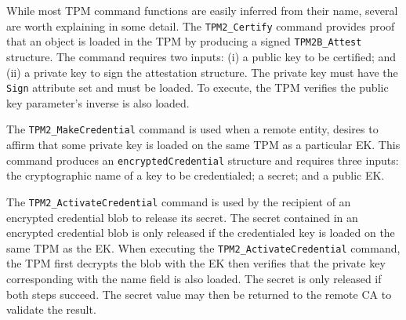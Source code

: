 \documentclass[runningheads]{llncs}
\begin{document}


While most TPM command functions are easily inferred from their name,
several are worth explaining in some detail.  The \verb|TPM2_Certify|
command provides proof that an object is loaded in the TPM by producing a
signed \verb|TPM2B_Attest| structure. The command requires two inputs:
(i) a public key to be certified; and (ii) a private key to sign the
attestation structure. The private key must have the \verb|Sign|
attribute set and must be loaded. To execute, the TPM verifies the
public key parameter's inverse is also loaded.


The \verb|TPM2_MakeCredential| command is used when a remote entity,
desires to affirm that some private key is loaded on the same TPM as a
particular EK. This command produces an
\verb|encryptedCredential| structure and requires three inputs: the
cryptographic name of a key to be credentialed; a secret; and a public
EK. %

The \verb|TPM2_ActivateCredential| command is used by the recipient of
an encrypted credential blob to release its secret.  The secret
contained in an encrypted credential blob is only released if the
credentialed key is loaded on the same TPM as the EK.  When executing
the \verb|TPM2_ActivateCredential| command, the TPM first decrypts the
blob with the EK then verifies that the private key corresponding with
the name field is also loaded. The secret is only released if both
steps succeed. The secret value may then be returned to the remote CA
to validate the result.
\end{document}
